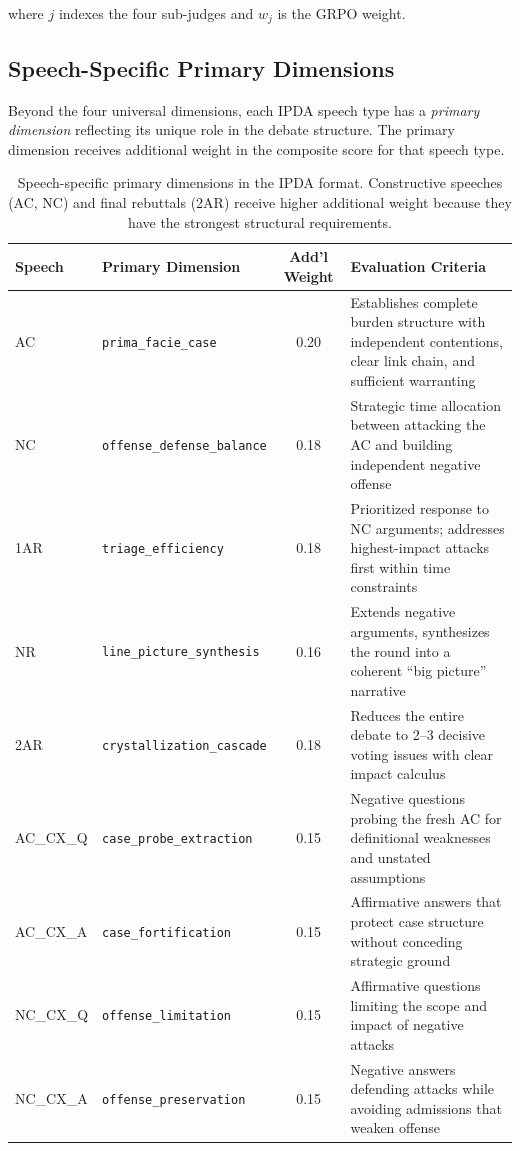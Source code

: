 \noindent where $j$ indexes the four sub-judges and $w_j$ is the GRPO weight.

\subsection{Speech-Specific Primary Dimensions}

Beyond the four universal dimensions, each IPDA speech type has a
\emph{primary dimension} reflecting its unique role in the debate structure.
The primary dimension receives additional weight in the composite score
for that speech type.

\begin{table}[h]
\centering
\small
\begin{tabular}{llcp{5cm}}
\toprule
\textbf{Speech} & \textbf{Primary Dimension} & \textbf{Add'l Weight} & \textbf{Evaluation Criteria} \\
\midrule
AC & \texttt{prima\_facie\_case} & 0.20 & Establishes complete burden structure with independent contentions, clear link chain, and sufficient warranting \\
NC & \texttt{offense\_defense\_balance} & 0.18 & Strategic time allocation between attacking the AC and building independent negative offense \\
1AR & \texttt{triage\_efficiency} & 0.18 & Prioritized response to NC arguments; addresses highest-impact attacks first within time constraints \\
NR & \texttt{line\_picture\_synthesis} & 0.16 & Extends negative arguments, synthesizes the round into a coherent ``big picture'' narrative \\
2AR & \texttt{crystallization\_cascade} & 0.18 & Reduces the entire debate to 2--3 decisive voting issues with clear impact calculus \\
\midrule
AC\_CX\_Q & \texttt{case\_probe\_extraction} & 0.15 & Negative questions probing the fresh AC for definitional weaknesses and unstated assumptions \\
AC\_CX\_A & \texttt{case\_fortification} & 0.15 & Affirmative answers that protect case structure without conceding strategic ground \\
NC\_CX\_Q & \texttt{offense\_limitation} & 0.15 & Affirmative questions limiting the scope and impact of negative attacks \\
NC\_CX\_A & \texttt{offense\_preservation} & 0.15 & Negative answers defending attacks while avoiding admissions that weaken offense \\
\bottomrule
\end{tabular}
\caption{Speech-specific primary dimensions in the IPDA format.
Constructive speeches (AC, NC) and final rebuttals (2AR) receive higher
additional weight because they have the strongest structural requirements.}
\label{tab:speech_dimensions}
\end{table}

